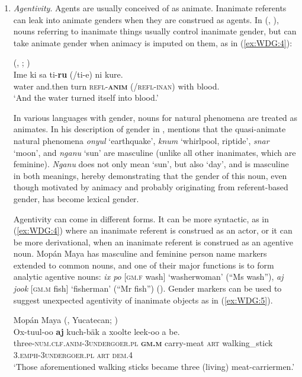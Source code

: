 \documentclass[output=collectionpaper]{langsci/langscibook}
\begin{document}
\begin{enumerate}[label=(\roman*)]
\item \textit{Agentivity}. Agents are usually conceived of as animate. Inanimate referents can leak into animate genders when they are construed as agents. In  (, ), nouns referring to inanimate things usually control inanimate gender, but can take animate gender when animacy is imputed on them, as in (\ref{ex:WDG:4}):

\ea\label{ex:WDG:4}
 (, ; \citealt[32]{Gore1926})\\
\gll Ime	ki	sa	ti-\textbf{ru}	(/ti-e)	ni	kure.\\
 water	and.then	turn	\textsc{refl-\textbf{anim}}	(/\textsc{refl-inan})	with	blood.\\
\glt `And the water turned itself into blood.'\\
\z

In various languages with gender, nouns for natural phenomena are treated as animates. In his description of gender in ,  mentions that the quasi-animate natural phenomena \textit{onyul} `earthquake', \textit{knum} `whirlpool, riptide', \textit{snar} `moon', and \textit{nganu} `sun' are masculine (unlike all other inanimates, which are feminine). \textit{Nganu} does not only mean `sun', but also `day', and is masculine in both meanings, hereby demonstrating that the gender of this noun, even though motivated by animacy and probably originating from referent-based gender, has become lexical gender.

Agentivity can come in different forms. It can be more syntactic, as in (\ref{ex:WDG:4}) where an inanimate referent is construed as an actor, or it can be more derivational, when an inanimate referent is construed as an agentive noun. Mopán Maya has masculine and feminine person name markers extended to common nouns, and one of their major functions is to form analytic agentive nouns: \textit{ix p\textquotesingle{}o\textquotesingle{}} [\textsc{gm.f} wash] `washerwoman' (``Ms wash''), \textit{aj jook\textquotesingle{}} [\textsc{gm.m} fish] `fisherman' (``Mr fish'') (\citealt[140]{Contini-Morava2018}). Gender markers can be used to suggest unexpected agentivity of inanimate objects as in (\ref{ex:WDG:5}).

\ea\label{ex:WDG:5}
Mopán Maya (, Yucatecan; \citealt[141]{Contini-Morava2018})\\
\gll Ox-tuul-oo\textquotesingle{}	\textbf{aj}	kuch-b\textquotesingle{}äk\textquotesingle{} a	xoolte\textquotesingle{}	leek-oo\textquotesingle{}	a	b\textquotesingle{}e\textquotesingle{}.\\
three-\textsc{num.clf.anim-3undergoer.pl}	\textbf{\textsc{gm.m}}	carry-meat \textsc{art}	walking\_stick	\textsc{3.emph-3undergoer.pl}	\textsc{art}	\textsc{dem.4}\\
\glt `Those aforementioned walking sticks became three (living) meat-carriermen.'\\
\z


\end{enumerate}
\end{document}
